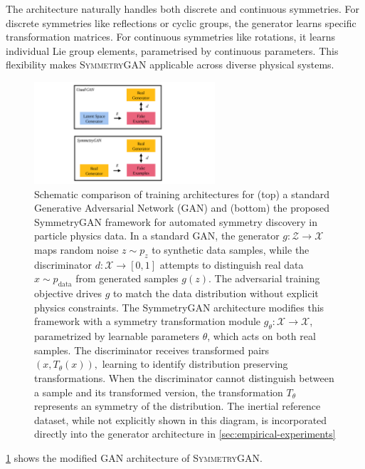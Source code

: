     The architecture naturally handles both discrete and continuous symmetries.
    For discrete symmetries like reflections or cyclic groups, the generator learns specific transformation matrices.
    For continuous symmetries like rotations, it learns individual Lie group elements, parametrised by continuous parameters.
    This flexibility makes \textsc{SymmetryGAN} applicable across diverse physical systems.
\begin{figure}
    \centering
    \includegraphics[width=0.6\textwidth]{figures/chapter-09/SchematicSymmetry2.pdf}
    \caption[Architectural comparison of standard GAN and SymmetryGAN for automated symmetry discovery.]{Schematic comparison of training architectures for (top) a standard Generative Adversarial Network (GAN) and (bottom) the proposed SymmetryGAN framework for automated symmetry discovery in particle physics data.
    In a standard GAN, the generator $g: \mathcal{Z} \to \mathcal{X}$ maps random noise $z \sim p_z$ to synthetic data samples, while the discriminator $d: \mathcal{X} \to [0,1]$ attempts to distinguish real data $x \sim p_{\text{data}}$ from generated samples $g(z)$. The adversarial training objective drives $g$ to match the data distribution without explicit physics constraints.
    The SymmetryGAN architecture modifies this framework with a symmetry transformation module $g_\theta: \mathcal{X} \to \mathcal{X}$, parametrized by learnable parameters $\theta$, which acts on both real samples. The discriminator receives transformed pairs $(x, T_\theta(x)),$ learning to identify distribution preserving transformations. When the discriminator cannot distinguish between a sample and its transformed version, the transformation $T_\theta$ represents an symmetry of the distribution.
    The inertial reference dataset, while not explicitly shown in this diagram, is incorporated directly into the generator architecture in \cref{sec:empirical-experiments}}
    \label{fig:symmetrygan-schematic}
\end{figure}
    \cref{fig:symmetrygan-schematic} shows the modified GAN architecture of \textsc{SymmetryGAN}.
    
